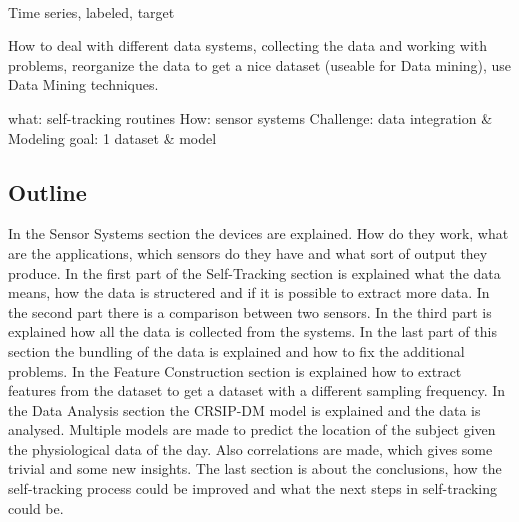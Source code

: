 		\
			
		Time series, labeled, target

		How to deal with different data systems, collecting the data and working with problems, reorganize the data to get a nice dataset (useable for Data mining), use Data Mining techniques.

		what: self-tracking routines
		How: sensor systems
		Challenge: data integration \& Modeling
		goal: 1 dataset \& model
		\fi

	\subsection{Outline}
		In the Sensor Systems section the devices are explained. How do they work, what are the applications, which sensors do they have and what sort of output they produce. In the first part of the Self-Tracking section is explained what the data means, how the data is structered and if it is possible to extract more data. In the second part there is a comparison between two sensors. In the third part is explained how all the data is collected from the systems. In the last part of this section the bundling of the data is explained and how to fix the additional problems. In the Feature Construction section is explained how to extract features from the dataset to get a dataset with a different sampling frequency. In the Data Analysis section the CRSIP-DM model is explained and the data is analysed. Multiple models are made to predict the location of the subject given the physiological data of the day. Also correlations are made, which gives some trivial and some new insights. The last section is about the conclusions, how the self-tracking process could be improved and what the next steps in self-tracking could be.
		
	
	\iffalse
		Klad		


		It's important to explain which systems are being used, what the data means and how the data looks like. Next section there is a comparison between the two physiological devices, what was really useful to learn the devices. The data collection is the most important part of the thesis, because it's explaining how everything was set up and done to get the provided dataset. - Modeling - Conclusions 

		In the Sensor System section the hardware is explained, what the sensors does, what the applications are and how it works. 
		In the experiments section describes useful derivative data, a comparison between the two physiological devices and the experiment to combine all three devices to a good dataset.
		Modeling: I made a dataset of 15 days with all kind of features. Set the deep sleep as target attribute and use WeKa to make a model, with a discussion why deep sleep as target, how the algorithm works and hopefully some insights of the model. 
	\fi
